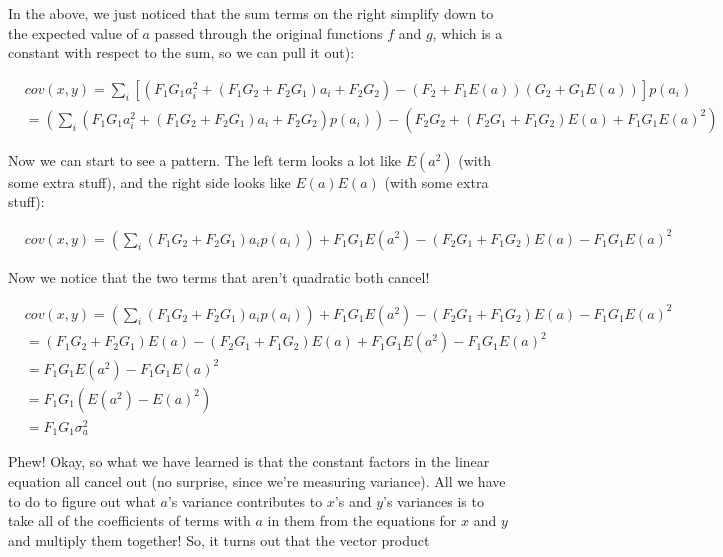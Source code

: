 \documentclass[12pt]{article}
\begin{document}
In the above, we just noticed that the sum terms on the right simplify down to
the expected value of $a$ passed through the original functions $f$ and $g$,
which is a constant with respect to the sum, so we can pull it out):

\begin{align}
  &cov(x,y) = \sum_i \left[\left (F_1 G_1 a_i^2 + (F_1 G_2 + F_2 G_1)a_i+F_2 G_2\right) -
\left(F_2 + F_1 E(a)\right)\left(G_2+G_1 E(a)\right)\right]p(a_i)\\
&= \left(\sum_i \left (F_1 G_1 a_i^2 + (F_1 G_2 + F_2 G_1)a_i+F_2 G_2\right)p(a_i)\right) -
\left(F_2 G_2 + (F_2 G_1 + F_1 G_2) E(a) + F_1 G_1 E(a)^2\right)
\end{align}

Now we can start to see a pattern. The left term looks a lot like $E(a^2)$ (with
some extra stuff), and the right side looks like $E(a)E(a)$ (with some extra
stuff):

\begin{align}
  &cov(x,y) = \left(\sum_i (F_1 G_2 + F_2 G_1)a_ip(a_i)\right) + F_1 G_1 E(a^2)
  -(F_2 G_1 + F_1 G_2) E(a) - F_1 G_1 E(a)^2
\end{align}

Now we notice that the two terms that aren't quadratic both cancel!

\begin{align}
  &cov(x,y) = \left(\sum_i (F_1 G_2 + F_2 G_1)a_ip(a_i)\right) + F_1 G_1 E(a^2)
  -(F_2 G_1 + F_1 G_2) E(a) - F_1 G_1 E(a)^2\\
  &= (F_1 G_2 + F_2 G_1)E(a) -(F_2 G_1 + F_1 G_2) E(a)  +  F_1 G_1 E(a^2) - F_1
  G_1 E(a)^2\\
  &= F_1 G_1 E(a^2) - F_1 G_1 E(a)^2\\
  &= F_1 G_1 (E(a^2) - E(a)^2) \\
  &= F_1 G_1 \sigma_a^2
\end{align}

Phew! Okay, so what we have learned is that the constant factors in the linear
equation all cancel out (no surprise, since we're measuring variance). All we
have to do to figure out what $a$'s variance contributes to $x$'s and $y$'s
variances is to take all of the coefficients of terms with $a$ in them from the
equations for $x$ and $y$ and multiply them together! So, it turns out that the
vector product 
\end{document}
